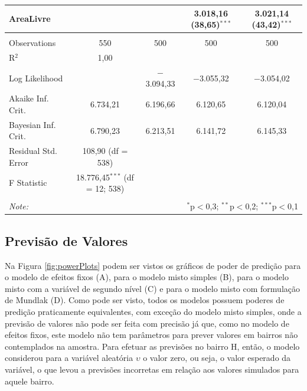 \documentclass[
  a4paper, 12pt]{article}
\begin{document}
\begin{table}[H]
\begin{tabular}{@{\extracolsep{5pt}}lcccc}
  AreaLivre &  &  & 3.018,16 (38,65)$^{***}$ & 3.021,14 (43,42)$^{***}$ \\ 
 \hline \\[-1.8ex] 
Observations & 550 & 500 & 500 & 500 \\ 
R$^{2}$ & 1,00 &  &  &  \\ 
Log Likelihood &  & $-$3.094,33 & $-$3.055,32 & $-$3.054,02 \\ 
Akaike Inf. Crit. & 6.734,21 & 6.196,66 & 6.120,65 & 6.120,04 \\ 
Bayesian Inf. Crit. & 6.790,23 & 6.213,51 & 6.141,72 & 6.145,33 \\ 
Residual Std. Error & 108,90 (df = 538) &  &  &  \\ 
F Statistic & 18.776,45$^{***}$ (df = 12; 538) &  &  &  \\ 
\hline 
\hline \\[-1.8ex] 
\textit{Note:}  & \multicolumn{4}{r}{$^{*}$p$<$0,3; $^{**}$p$<$0,2; $^{***}$p$<$0,1} \\ 
\end{tabular} 
\end{table}

\hypertarget{previsuxe3o-de-valores}{%
\subsection{Previsão de Valores}\label{previsuxe3o-de-valores}}

Na Figura \ref{fig:powerPlots} podem ser vistos os gráficos de poder de
predição para o modelo de efeitos fixos (A), para o modelo misto simples
(B), para o modelo misto com a variável de segundo nível (C) e para o
modelo misto com formulação de Mundlak (D). Como pode ser visto, todos
os modelos possuem poderes de predição praticamente equivalentes, com
exceção do modelo misto simples, onde a previsão de valores não pode ser
feita com precisão já que, como no modelo de efeitos fixos, este modelo
não tem parâmetros para prever valores em bairros não contemplados na
amostra. Para efetuar as previsões no bairro H, então, o modelo
considerou para a variável aleatória \(\upsilon\) o valor zero, ou seja,
o valor esperado da variável, o que levou a previsões incorretas em
relação aos valores simulados para aquele bairro.
\end{document}

